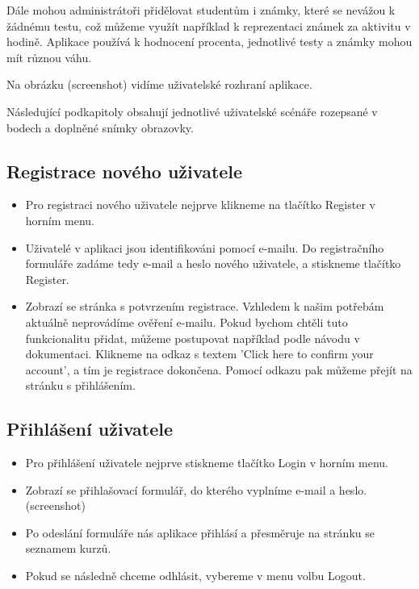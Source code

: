 Dále mohou administrátoři přidělovat studentům i známky, které se nevážou k žádnému testu, což můžeme využít například k reprezentaci známek za aktivitu v hodině.
Aplikace používá k hodnocení procenta, jednotlivé testy a známky mohou mít různou váhu. 

Na obrázku (screenshot) vidíme uživatelské rozhraní aplikace.

\vspace{\baselineskip}

Následující podkapitoly obsahují jednotlivé uživatelské scénáře rozepsané v bodech a doplněné snímky obrazovky.

\subsection{Registrace nového uživatele}

\begin{itemize}
	\item Pro registraci nového uživatele nejprve klikneme na tlačítko Register v horním menu.
	\item Uživatelé v aplikaci jsou identifikováni pomocí e-mailu. Do registračního formuláře zadáme tedy e-mail a heslo nového uživatele, a stiskneme tlačítko Register.
	\item Zobrazí se stránka s potvrzením registrace. Vzhledem k našim potřebám aktuálně neprovádíme ověření e-mailu. Pokud bychom chtěli tuto funkcionalitu přidat, můžeme postupovat například podle návodu v dokumentaci. \cite{AspNetCoreDocs} Klikneme na odkaz s textem 'Click here to confirm your account', a tím je registrace dokončena. Pomocí odkazu pak můžeme přejít na stránku s přihlášením.
\end{itemize}

\subsection{Přihlášení uživatele}

\begin{itemize}
	\item Pro přihlášení uživatele nejprve stiskneme tlačítko Login v horním menu.
	\item Zobrazí se přihlašovací formulář, do kterého vyplníme e-mail a heslo. (screenshot)
	\item Po odeslání formuláře nás aplikace přihlásí a přesměruje na stránku se seznamem kurzů.
	\item Pokud se následně chceme odhlásit, vybereme v menu volbu Logout.
\end{itemize}

